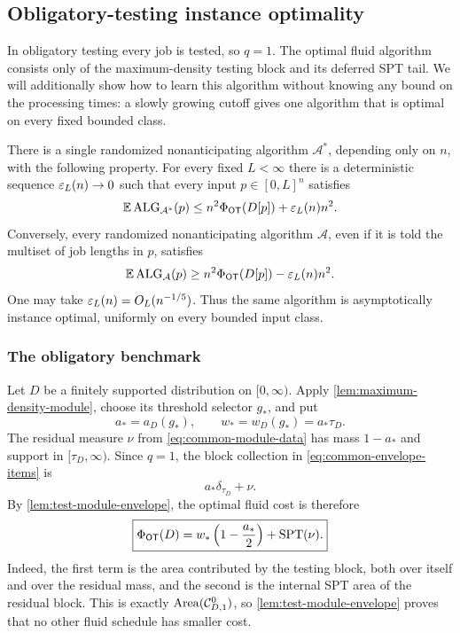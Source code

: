 \subsection{Obligatory-testing instance optimality}
\label{sec:obligatory-instance}

In obligatory testing every job is tested, so $q=1$.  The optimal fluid
algorithm consists only of the maximum-density testing block and its
deferred SPT tail.  We will additionally show how to learn this algorithm
without knowing any bound on the processing times: a slowly growing cutoff
gives one algorithm that is optimal on every fixed bounded class.

\begin{theorem}
\label{thm:obligatory-instance}
There is a single randomized nonanticipating algorithm $\mathcal A^*$,
depending only on $n$, with the following property.  For every fixed
$L<\infty$ there is a deterministic sequence $\varepsilon_L(n)\to0$ such that every
input $p\in[0,L]^n$ satisfies
\begin{equation}
 \mathbb{E}\operatorname{ALG}_{\mathcal A^*}(p)
 \le n^2\Phi_{\mathsf{OT}}(D[p])+\varepsilon_L(n)n^2.
 \label{eq:ot-instance-upper}
\end{equation}
Conversely, every randomized nonanticipating algorithm $\mathcal A$, even if
it is told the multiset of job lengths in $p$, satisfies
\begin{equation}
 \mathbb{E}\operatorname{ALG}_{\mathcal A}(p)
 \ge n^2\Phi_{\mathsf{OT}}(D[p])-\varepsilon_L(n)n^2.
 \label{eq:ot-instance-lower}
\end{equation}
One may take $\varepsilon_L(n)=O_L(n^{-1/5})$.  Thus the same algorithm is
asymptotically instance optimal, uniformly on every bounded input class.
\end{theorem}

\subsubsection{The obligatory benchmark}

Let $D$ be a finitely supported distribution on $[0,\infty)$.  Apply
\cref{lem:maximum-density-module}, choose its threshold selector $g_*$, and
put
\begin{equation}
 a_*=a_D(g_*),\qquad w_*=w_D(g_*)=a_*\tau_D.
 \label{eq:ot-module-threshold}
\end{equation}
The residual measure $\nu$ from \cref{eq:common-module-data} has mass
$1-a_*$ and support in $[\tau_D,\infty)$.  Since $q=1$, the block collection
in \cref{eq:common-envelope-items} is
\[
                       a_*\delta_{\tau_D}+\nu.
\]
By \cref{lem:test-module-envelope}, the optimal fluid cost is therefore
\begin{equation}
 \boxed{
 \Phi_{\mathsf{OT}}(D)
 =w_*\left(1-\frac{a_*}{2}\right)+\operatorname{SPT}(\nu).}
 \label{eq:ot-Phi}
\end{equation}
Indeed, the first term is the area contributed by the testing block, both
over itself and over the residual mass, and the second is the internal SPT
area of the residual block.  This is exactly
$\operatorname{Area}(\mathcal C^0_{D,1})$, so \cref{lem:test-module-envelope} proves that
no other fluid schedule has smaller cost.

